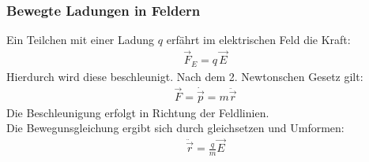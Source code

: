 \documentclass{article}
\begin{document}
\subsubsection{Bewegte Ladungen in Feldern}
Ein Teilchen mit einer Ladung $q$ erfährt im elektrischen Feld die Kraft:
\begin{align}
    \vec{F}_E=q\,\vec{E}
\end{align}
Hierdurch wird diese beschleunigt. Nach dem 2. Newtonschen Gesetz gilt:
\begin{align}
    \vec{F}=\dot{\vec{p}}=m\ddot{\vec{r}}
\end{align}
Die Beschleunigung erfolgt in Richtung der Feldlinien.\\
Die Bewegunsgleichung ergibt sich durch gleichsetzen und Umformen:
\begin{align}
    \ddot{\vec{r}}=\frac{q}{m}\vec{E}
\end{align}
\end{document}
